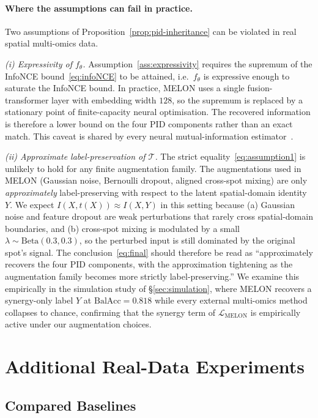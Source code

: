 \documentclass{article}
\theoremstyle{plain}
\theoremstyle{definition}
\begin{document}
\paragraph{Where the assumptions can fail in practice.}
Two assumptions of Proposition~\ref{prop:pid-inheritance} can be violated in real spatial multi-omics data.

\emph{(i) Expressivity of $f_\theta$.} Assumption~\ref{ass:expressivity} requires the supremum of the InfoNCE bound~\eqref{eq:infoNCE} to be attained, i.e.\ $f_\theta$ is expressive enough to saturate the InfoNCE bound. In practice, MELON uses a single fusion-transformer layer with embedding width $128$, so the supremum is replaced by a stationary point of finite-capacity neural optimisation. The recovered information is therefore a lower bound on the four PID components rather than an exact match. This caveat is shared by every neural mutual-information estimator~\citep{oord2018representation,tian2020contrastive}.

\emph{(ii) Approximate label-preservation of $\mathcal{T}$.} The strict equality~\eqref{eq:assumption1} is unlikely to hold for any finite augmentation family. The augmentations used in MELON (Gaussian noise, Bernoulli dropout, aligned cross-spot mixing) are only \emph{approximately} label-preserving with respect to the latent spatial-domain identity $Y$. We expect $I(X, t(X)) \approx I(X, Y)$ in this setting because (a) Gaussian noise and feature dropout are weak perturbations that rarely cross spatial-domain boundaries, and (b) cross-spot mixing is modulated by a small $\lambda \sim \mathrm{Beta}(0.3, 0.3)$, so the perturbed input is still dominated by the original spot's signal. The conclusion~\eqref{eq:final} should therefore be read as ``approximately recovers the four PID components, with the approximation tightening as the augmentation family becomes more strictly label-preserving.'' We examine this empirically in the simulation study of \S\ref{sec:simulation}, where MELON recovers a synergy-only label $Y$ at $\mathrm{BalAcc} = 0.818$ while every external multi-omics method collapses to chance, confirming that the synergy term of $\mathcal{L}_{\mathrm{MELON}}$ is empirically active under our augmentation choices.

\section{Additional Real-Data Experiments}\label{app:extra-exp}

\subsection{Compared Baselines}\label{app:baselines}
\end{document}

